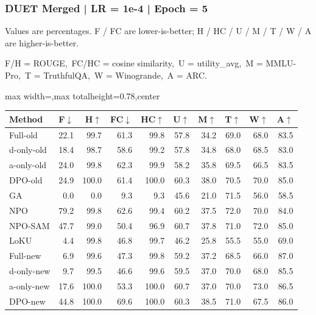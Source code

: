 \documentclass[aspectratio=169,11pt]{beamer}
\begin{document}
\begin{frame}[t]
\frametitle{DUET Merged | LR = 1e-4 | Epoch = 5}
{\tiny Values are percentages. F / FC are lower-is-better; H / HC / U / M / T / W / A are higher-is-better.}

{\tiny F/H = ROUGE,\ FC/HC = cosine similarity,\ U = utility\_avg,\ M = MMLU-Pro,\ T = TruthfulQA,\ W = Winogrande,\ A = ARC.}

\vspace{0.35em}
\centering
\scriptsize
\setlength{\tabcolsep}{3.6pt}
\renewcommand{\arraystretch}{1.05}
\begin{adjustbox}{max width=\textwidth,max totalheight=0.78\textheight,center}
\begin{tabular}{l*{9}{r}}
\toprule
Method & F$\downarrow$ & H$\uparrow$ & FC$\downarrow$ & HC$\uparrow$ & U$\uparrow$ & M$\uparrow$ & T$\uparrow$ & W$\uparrow$ & A$\uparrow$ \\
\midrule
\rowcolor{blue!10}
Full-old & 22.1 & 99.7 & 61.3 & 99.8 & 57.8 & 34.2 & 69.0 & 68.0 & 83.5 \\
\rowcolor{orange!10}
d-only-old & 18.4 & 98.7 & 58.6 & 99.2 & 57.8 & 34.8 & 68.0 & 68.5 & 83.0 \\
\rowcolor{green!10}
a-only-old & 24.0 & 99.8 & 62.3 & 99.9 & 58.2 & 35.8 & 69.5 & 66.5 & 83.5 \\
\rowcolor{gray!8}
DPO-old & 24.9 & 100.0 & 61.4 & 100.0 & 60.3 & 38.0 & 70.5 & 70.0 & 85.0 \\
\rowcolor{gray!8}
GA & 0.0 & 0.0 & 9.3 & 9.3 & 45.6 & 21.0 & 71.5 & 56.0 & 58.5 \\
\rowcolor{gray!8}
NPO & 79.2 & 99.8 & 62.6 & 99.4 & 60.2 & 37.5 & 72.0 & 70.0 & 84.0 \\
\rowcolor{gray!8}
NPO-SAM & 47.7 & 99.0 & 50.4 & 96.9 & 60.7 & 37.8 & 71.0 & 72.0 & 85.0 \\
\rowcolor{gray!8}
LoKU & 4.4 & 99.8 & 46.8 & 99.7 & 46.2 & 25.8 & 55.5 & 55.0 & 69.0 \\
\rowcolor{blue!20}
Full-new & 6.9 & 99.6 & 47.3 & 99.8 & 59.2 & 37.2 & 68.5 & 66.0 & 87.0 \\
\rowcolor{orange!20}
d-only-new & 9.7 & 99.5 & 46.6 & 99.6 & 59.5 & 37.0 & 70.0 & 68.0 & 85.5 \\
\rowcolor{green!20}
a-only-new & 17.6 & 100.0 & 53.3 & 100.0 & 60.7 & 37.0 & 70.0 & 73.0 & 86.5 \\
\rowcolor{gray!15}
DPO-new & 44.8 & 100.0 & 69.6 & 100.0 & 60.3 & 38.5 & 71.0 & 67.5 & 86.0 \\
\bottomrule
\end{tabular}
\end{adjustbox}
\end{frame}
\end{document}
